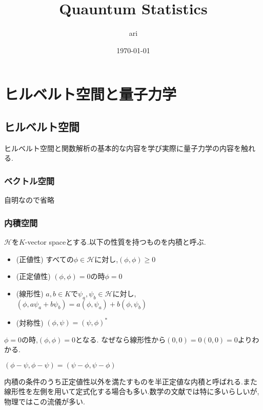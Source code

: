 \documentclass[uplatex]{jsbook}
\title{Quauntum Statistics}
\author{ari}
\date{\today}
\begin{document}
\maketitle
\tableofcontents
\part{ヒルベルト空間と量子力学}
\chapter{ヒルベルト空間}
ヒルベルト空間と関数解析の基本的な内容を学び実際に量子力学の内容を触れる.
\section{ベクトル空間}
自明なので省略

\section{内積空間}

\begin{screen}
\begin{dfn}
 $\mathcal{H}$を$K$-vector spaceとする.以下の性質を持つものを内積と呼ぶ.
 \begin{itemize}
   \item (正値性) すべての$\phi \in \mathcal{H}$に対し,$(\phi, \phi) \ge 0$
   \item (正定値性) $(\phi, \phi) = 0$の時$\phi = 0$
   \item (線形性) $a,b \in K$で$\psi_a, \psi_b \in \mathcal{H}$に対し,$(\phi, a \psi_a + b\psi_b) = a(\phi, \psi_a) + b(\phi, \psi_b)$
   \item (対称性) $(\phi, \psi) = (\psi, \phi)^*$
 \end{itemize}
\end{dfn}
\end{screen}

\begin{rem}
  $\phi = 0$の時,$(\phi, \phi) = 0$となる. なぜなら線形性から$(0, 0) = 0(0, 0) = 0$よりわかる.
\end{rem}

\begin{rem}
  $(\phi - \psi, \phi - \psi) = (\psi - \phi, \psi - \phi)$
\end{rem}

\begin{rem}
  内積の条件のうち正定値性以外を満たすものを半正定値な内積と呼ばれる.また線形性を左側を用いて定式化する場合も多い.数学の文献では特に多いらしいが,物理ではこの流儀が多い.
\end{rem}
\end{document}
